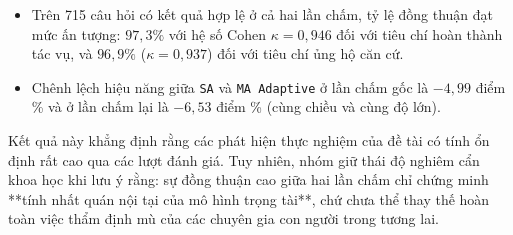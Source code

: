 \begin{itemize}
    \item Trên 715 câu hỏi có kết quả hợp lệ ở cả hai lần chấm, tỷ lệ đồng thuận đạt mức ấn tượng: \textbf{$97{,}3\%$} với hệ số Cohen $\kappa = 0{,}946$ đối với tiêu chí hoàn thành tác vụ, và \textbf{$96{,}9\%$} ($\kappa = 0{,}937$) đối với tiêu chí ủng hộ căn cứ.
    \item Chênh lệch hiệu năng giữa \texttt{SA} và \texttt{MA Adaptive} ở lần chấm gốc là $-4{,}99$ điểm \% và ở lần chấm lại là $-6{,}53$ điểm \% (cùng chiều và cùng độ lớn).
\end{itemize}

Kết quả này khẳng định rằng các phát hiện thực nghiệm của đề tài có tính ổn định rất cao qua các lượt đánh giá. Tuy nhiên, nhóm giữ thái độ nghiêm cẩn khoa học khi lưu ý rằng: sự đồng thuận cao giữa hai lần chấm chỉ chứng minh **tính nhất quán nội tại của mô hình trọng tài**, chứ chưa thể thay thế hoàn toàn việc thẩm định mù của các chuyên gia con người trong tương lai.
